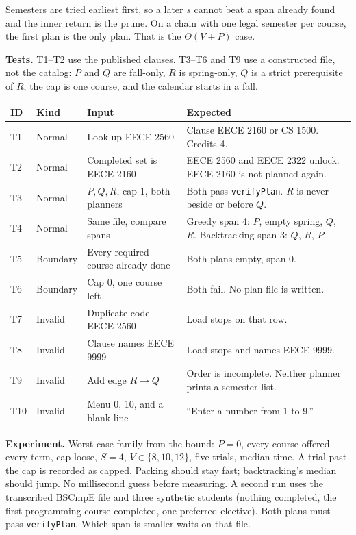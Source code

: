 \documentclass[10pt]{article}
\begin{document}
Semesters are tried earliest first, so a later \(s\) cannot beat a span already
found and the inner return is the prune. On a chain with one legal semester
per course, the first plan is the only plan. That is the \(\Theta(V+P)\) case.

\textbf{Tests.}
\label{sec:tests}
T1--T2 use the published clauses. T3--T6 and T9 use a constructed file, not the
catalog: \(P\) and \(Q\) are fall-only, \(R\) is spring-only, \(Q\) is a strict
prerequisite of \(R\), the cap is one course, and the calendar starts in a fall.

{\scriptsize
\begin{tabularx}{\linewidth}{@{}l l Y Y@{}}
\toprule
\textbf{ID} & \textbf{Kind} & \textbf{Input} & \textbf{Expected} \\
\midrule
T1 & Normal & Look up EECE 2560 &
Clause EECE 2160 or CS 1500. Credits 4. \\
T2 & Normal & Completed set is EECE 2160 &
EECE 2560 and EECE 2322 unlock. EECE 2160 is not planned again. \\
T3 & Normal & \(P, Q, R\), cap 1, both planners &
Both pass \texttt{verifyPlan}. \(R\) is never beside or before \(Q\). \\
T4 & Normal & Same file, compare spans &
Greedy span 4: \(P\), empty spring, \(Q\), \(R\).
Backtracking span 3: \(Q\), \(R\), \(P\). \\
T5 & Boundary & Every required course already done &
Both plans empty, span 0. \\
T6 & Boundary & Cap 0, one course left &
Both fail. No plan file is written. \\
T7 & Invalid & Duplicate code EECE 2560 &
Load stops on that row. \\
T8 & Invalid & Clause names EECE 9999 &
Load stops and names EECE 9999. \\
T9 & Invalid & Add edge \(R \to Q\) &
Order is incomplete. Neither planner prints a semester list. \\
T10 & Invalid & Menu 0, 10, and a blank line &
``Enter a number from 1 to 9.'' \\
\bottomrule
\end{tabularx}}

\textbf{Experiment.} Worst-case family from the bound: \(P = 0\), every course
offered every term, cap loose, \(S = 4\), \(V \in \{8, 10, 12\}\), five trials,
median time. A trial past the cap is recorded as capped. Packing should stay
fast; backtracking's median should jump. No millisecond guess before measuring.
A second run uses the transcribed BSCmpE file and three synthetic students
(nothing completed, the first programming course completed, one preferred
elective). Both plans must pass \texttt{verifyPlan}. Which span is smaller
waits on that file.
\end{document}
